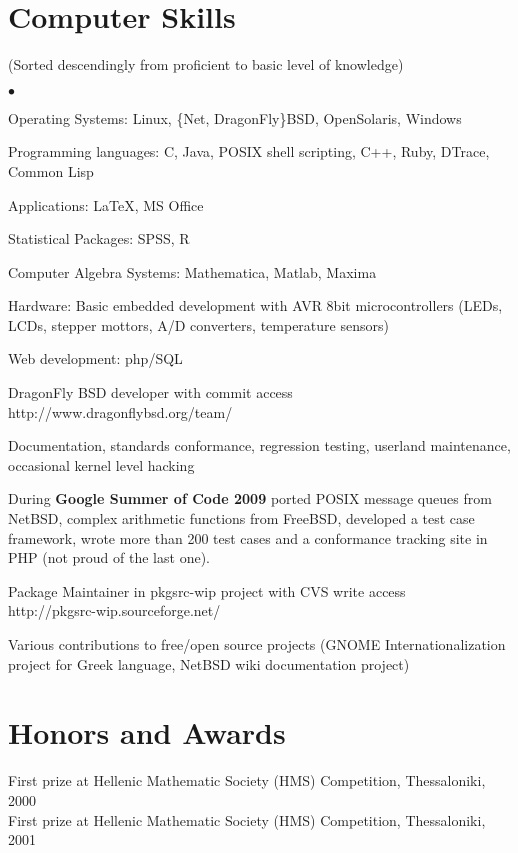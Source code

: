 \documentclass[margin,line]{res}
\newenvironment{list2}{
  \begin{list}{$\bullet$}{%
      \setlength{\itemsep}{0in}
      \setlength{\parsep}{0in} \setlength{\parskip}{0in}
      \setlength{\topsep}{0in} \setlength{\partopsep}{0in}
      \setlength{\leftmargin}{0.2in}}}{\end{list}}
\newenvironment{list3}{
  \begin{list}{
      \setlength{\leftmargin}{0.25in}}}{\end{list}}
\begin{document}
\begin{resume}
\section{\sc Computer Skills}
\small (Sorted descendingly from proficient to basic level of knowledge)
\normalsize
\begin{list2}
\item Operating Systems: Linux, \{Net, DragonFly\}BSD, OpenSolaris, Windows
\item Programming languages: C, Java, POSIX shell scripting, C++, Ruby, DTrace, Common Lisp
\item Applications: \LaTeX, MS Office
\item Statistical Packages: SPSS, R
\item Computer Algebra Systems: Mathematica, Matlab, Maxima
\item Hardware: Basic embedded development with AVR 8bit microcontrollers (LEDs, LCDs,
stepper mottors, A/D converters, temperature sensors)
\item Web development: php/SQL\\
\item DragonFly BSD developer with commit access\\http://www.dragonflybsd.org/team/
\begin{list3}
\item Documentation, standards conformance, regression testing, userland maintenance, occasional kernel level hacking
\item During {\bf Google Summer of Code 2009} ported POSIX message queues from NetBSD, complex
arithmetic functions from FreeBSD, developed a test case framework, wrote more than 200 test cases and a conformance
tracking site in PHP (not proud of the last one).
\end{list3}
\item Package Maintainer in pkgsrc-wip project with CVS write access \\http://pkgsrc-wip.sourceforge.net/
\item Various contributions to free/open source projects (GNOME Internationalization project for Greek language,
NetBSD wiki documentation project)
\end{list2}

\section{\sc Honors and Awards}
First prize at Hellenic Mathematic Society (HMS) Competition, Thessaloniki, 2000\\
First prize at Hellenic Mathematic Society (HMS) Competition, Thessaloniki, 2001


\end{resume}
\end{document}
